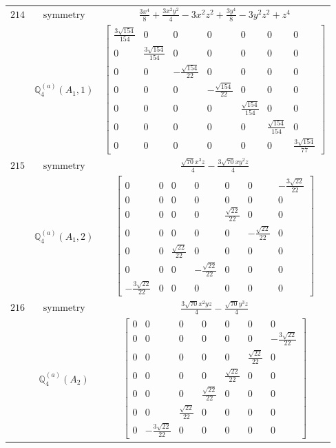 \documentclass[fleqn,8pt,landscape]{jsarticle}
\begin{document}
\begin{longtable}{ccc}
$ 214 $ & $ \text{symmetry} $ & $ \frac{3 x^{4}}{8} + \frac{3 x^{2} y^{2}}{4} - 3 x^{2} z^{2} + \frac{3 y^{4}}{8} - 3 y^{2} z^{2} + z^{4} $ \\
$  $ & $ \mathbb{Q}_{4}^{(a)}(A_{1},1) $ & $ \begin{bmatrix} \frac{3 \sqrt{154}}{154} & 0 & 0 & 0 & 0 & 0 & 0 \\ 0 & \frac{3 \sqrt{154}}{154} & 0 & 0 & 0 & 0 & 0 \\ 0 & 0 & - \frac{\sqrt{154}}{22} & 0 & 0 & 0 & 0 \\ 0 & 0 & 0 & - \frac{\sqrt{154}}{22} & 0 & 0 & 0 \\ 0 & 0 & 0 & 0 & \frac{\sqrt{154}}{154} & 0 & 0 \\ 0 & 0 & 0 & 0 & 0 & \frac{\sqrt{154}}{154} & 0 \\ 0 & 0 & 0 & 0 & 0 & 0 & \frac{3 \sqrt{154}}{77} \end{bmatrix} $ \\ \hline
$ 215 $ & $ \text{symmetry} $ & $ \frac{\sqrt{70} x^{3} z}{4} - \frac{3 \sqrt{70} x y^{2} z}{4} $ \\
$  $ & $ \mathbb{Q}_{4}^{(a)}(A_{1},2) $ & $ \begin{bmatrix} 0 & 0 & 0 & 0 & 0 & 0 & - \frac{3 \sqrt{22}}{22} \\ 0 & 0 & 0 & 0 & 0 & 0 & 0 \\ 0 & 0 & 0 & 0 & \frac{\sqrt{22}}{22} & 0 & 0 \\ 0 & 0 & 0 & 0 & 0 & - \frac{\sqrt{22}}{22} & 0 \\ 0 & 0 & \frac{\sqrt{22}}{22} & 0 & 0 & 0 & 0 \\ 0 & 0 & 0 & - \frac{\sqrt{22}}{22} & 0 & 0 & 0 \\ - \frac{3 \sqrt{22}}{22} & 0 & 0 & 0 & 0 & 0 & 0 \end{bmatrix} $ \\ \hline
$ 216 $ & $ \text{symmetry} $ & $ \frac{3 \sqrt{70} x^{2} y z}{4} - \frac{\sqrt{70} y^{3} z}{4} $ \\
$  $ & $ \mathbb{Q}_{4}^{(a)}(A_{2}) $ & $ \begin{bmatrix} 0 & 0 & 0 & 0 & 0 & 0 & 0 \\ 0 & 0 & 0 & 0 & 0 & 0 & - \frac{3 \sqrt{22}}{22} \\ 0 & 0 & 0 & 0 & 0 & \frac{\sqrt{22}}{22} & 0 \\ 0 & 0 & 0 & 0 & \frac{\sqrt{22}}{22} & 0 & 0 \\ 0 & 0 & 0 & \frac{\sqrt{22}}{22} & 0 & 0 & 0 \\ 0 & 0 & \frac{\sqrt{22}}{22} & 0 & 0 & 0 & 0 \\ 0 & - \frac{3 \sqrt{22}}{22} & 0 & 0 & 0 & 0 & 0 \end{bmatrix} $ \\ \hline

\end{longtable}
\end{document}
